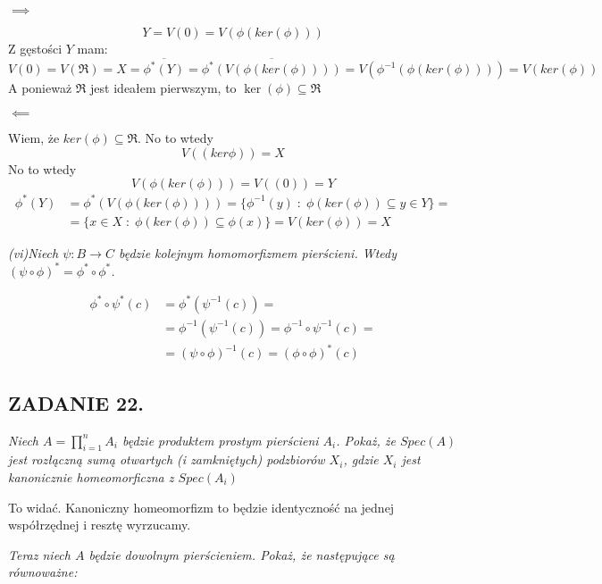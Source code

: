 \documentclass{article}
\begin{document}
$\implies$

$$Y=V(0)=V(\phi(ker(\phi)))$$
Z gęstości $Y$ mam:
$$V(0)=V(\mathfrak{R})=X=\overline{\phi^*(Y)}=\overline{\phi^*(V(\phi(ker(\phi))))}=V(\phi^{-1}(\phi(ker(\phi))))=V(ker(\phi))$$
A ponieważ $\mathfrak{R}$ jest ideałem pierwszym, to $\ker(\phi)\subseteq\mathfrak{R}$

$\impliedby$

Wiem, że $ker(\phi)\subseteq\mathfrak{R}$. No to wtedy
$$V((ker\phi))=X$$
No to wtedy
$$V(\phi(ker(\phi)))=V((0))=Y$$
\begin{align*}
    \phi^*(Y)&=\phi^*(V(\phi(ker(\phi))))=\{\phi^{-1}(y)\;:\;\phi(ker(\phi))\subseteq y\in Y\}=\\
    &=\{x\in X\;:\;\phi(ker(\phi))\subseteq\phi(x)\}=V(ker(\phi))=X
\end{align*}

\emph{\color{orange}(vi)Niech $\psi:B\to C$ będzie kolejnym homomorfizmem pierścieni. Wtedy $(\psi\circ\phi)^*=\phi^*\circ\phi^*$.}

\begin{center}
\end{center}

\begin{align*}
    \phi^*\circ\psi^*(c)&=\phi^*(\psi^{-1}(c))=\\
    &=\phi^{-1}(\psi^{-1}(c))=\phi^{-1}\circ\psi^{-1}(c)=\\
    &=(\psi\circ\phi)^{-1}(c)=(\phi\circ\phi)^*(c)
\end{align*}

\subsection*{ZADANIE 22.}
\emph{\color{yellow}Niech $A=\prod\limits_{i=1}^nA_i$ będzie produktem prostym pierścieni $A_i$. Pokaż, że $Spec(A)$ jest rozłączną sumą otwartych (i zamkniętych) podzbiorów $X_i$, gdzie $X_i$ jest kanonicznie homeomorficzna z $Spec(A_i)$}

To widać. Kanoniczny homeomorfizm to będzie identyczność na jednej współrzędnej i resztę wyrzucamy. 

\emph{\color{pink}Teraz niech $A$ będzie dowolnym pierścieniem. Pokaż, że następujące są równoważne:}
\end{document}
